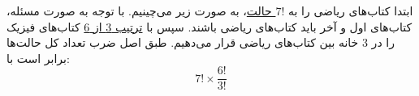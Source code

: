  \p
ابتدا کتاب‌های ریاضی را به
\underline{$7!$ حالت}،
به صورت زیر
 می‌چینیم. 
 با توجه به صورت مسئله، کتاب‌های اول و آخر باید کتاب‌های ریاضی باشند.
 \vspace*{+0.5cm}
 \vspace*{+0.4cm}
 سپس با
 \underline{ترتیب 3 از 6}
کتاب‌های فیزیک را در 
 3 خانه بین کتاب‌های ریاضی قرار می‌دهیم.
طبق اصل ضرب تعداد کل حالت‌ها برابر است با:
$$7! \times \frac{6!}{3!}$$